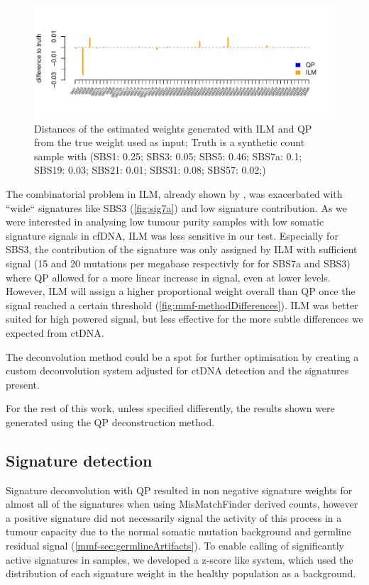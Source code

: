\begin{figure}[!ht]
\centering
\includegraphics[width=.99\linewidth]{Figures/MisMatchFinder/lowInputSignalDeconv.pdf}
\caption[Distance of deconvolution methods from truth]{Distances of the estimated weights generated with ILM and QP from the true weight used as input; Truth is a synthetic count sample with (SBS1: 0.25; SBS3: 0.05; SBS5: 0.46; SBS7a: 0.1; SBS19: 0.03; SBS21: 0.01; SBS31: 0.08; SBS57: 0.02;)}\label{fig:mmf-ILMerror}
\end{figure}
 
The combinatorial problem in ILM, already shown by \textcite{Lynch2016}, was exacerbated  with ``wide`` signatures like SBS3 (\autoref{fig:sig7a}) and low signature contribution. As we were interested in analysing low tumour purity samples with low somatic signature signals in cfDNA, ILM was less sensitive in our test. Especially for SBS3, the contribution of the signature was only assigned by ILM with sufficient signal (15 and 20 mutations per megabase respectivly for for SBS7a and SBS3) where QP allowed for a more linear increase in signal, even at lower levels. However, ILM will assign a higher proportional weight overall than QP once the signal reached a certain threshold (\autoref{fig:mmf-methodDifferences}). ILM was better suited for high powered signal, but less effective for the more subtle differences we expected from ctDNA.

The deconvolution method could be a spot for further optimisation by creating a custom deconvolution system adjusted for ctDNA detection and the signatures present.

For the rest of this work, unless specified differently, the results shown were generated using the QP deconstruction method.



\subsection{Signature detection}
\label{mmf-sec:sigdetection}
Signature deconvolution with QP resulted in non negative signature weights for almost all of the signatures when using MisMatchFinder derived counts, however a positive signature did not necessarily signal the activity of this process in a tumour capacity due to the normal somatic mutation background and germline residual signal (\autoref{mmf-sec:germlineArtifacts}). To enable calling of significantly active signatures in samples, we developed a z-score like system, which used the distribution of each signature weight in the healthy population as a background.

